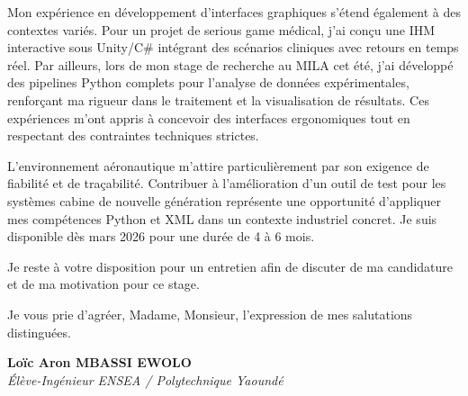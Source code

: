 \documentclass[a4paper,11pt]{article}
\begin{document}
Mon expérience en développement d'interfaces graphiques s'étend également à des contextes variés. Pour un projet de serious game médical, j'ai conçu une IHM interactive sous Unity/C\# intégrant des scénarios cliniques avec retours en temps réel. Par ailleurs, lors de mon stage de recherche au MILA cet été, j'ai développé des pipelines Python complets pour l'analyse de données expérimentales, renforçant ma rigueur dans le traitement et la visualisation de résultats. Ces expériences m'ont appris à concevoir des interfaces ergonomiques tout en respectant des contraintes techniques strictes.

L'environnement aéronautique m'attire particulièrement par son exigence de fiabilité et de traçabilité. Contribuer à l'amélioration d'un outil de test pour les systèmes cabine de nouvelle génération représente une opportunité d'appliquer mes compétences Python et XML dans un contexte industriel concret. Je suis disponible dès mars 2026 pour une durée de 4 à 6 mois.

Je reste à votre disposition pour un entretien afin de discuter de ma candidature et de ma motivation pour ce stage.

Je vous prie d'agréer, Madame, Monsieur, l'expression de mes salutations distinguées.

\vspace{0.8cm}

\textbf{Loïc Aron MBASSI EWOLO}\\
\textit{Élève-Ingénieur ENSEA / Polytechnique Yaoundé}
\end{document}
